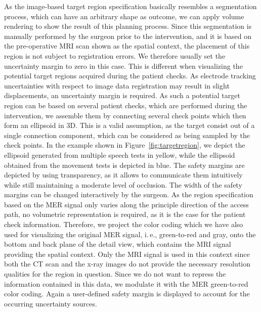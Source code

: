 \documentclass[journal]{vgtc}                %
\begin{document}
As the image-based target region specification basically resembles a segmentation process, which can have an arbitrary shape as outcome, we can apply volume rendering to show the result of this planning process. Since this segmentation is manually performed by the surgeon prior to the intervention, and it is based on the pre-operative MRI scan shown as the spatial context, the placement of this region is not subject to registration errors. We therefore usually set the uncertainty margin to zero in this case. This is different when visualizing the potential target regions acquired during the patient checks. As electrode tracking uncertainties with respect to image data registration may result in slight displacements, an uncertainty margin is required. As such a potential target region can be based on several patient checks, which are performed during the intervention, we assemble them by connecting several check points which then form an ellipsoid in 3D. This is a valid assumption, as the target consist out of a single connection component, which can be considered as being sampled by the check points. In the example shown in Figure~\ref{fig:targetregion}, we depict the ellipsoid generated from multiple speech tests in yellow, while the ellipsoid obtained from the movement tests is depicted in blue. The safety margins are depicted by using transparency, as it allows to communicate them intuitively while still maintaining a moderate level of occlusion. The width of the safety margins can be changed interactively by the surgeon. As the region specification based on the MER signal only varies along the principle direction of the access path, no volumetric representation is required, as it is the case for the patient check information. Therefore, we project the color coding which we have also used for visualizing the original MER signal, i.\,e., green-to-red and gray, onto the bottom and back plane of the detail view, which contains the MRI signal providing the spatial context. Only the MRI signal is used in this context since both the CT scan and the x-ray images do not provide the necessary resolution qualities for the region in question. Since we do not want to repress the information contained in this data, we modulate it with the MER green-to-red color coding. Again a user-defined safety margin is displayed to account for the occurring uncertainty sources.
\end{document}
